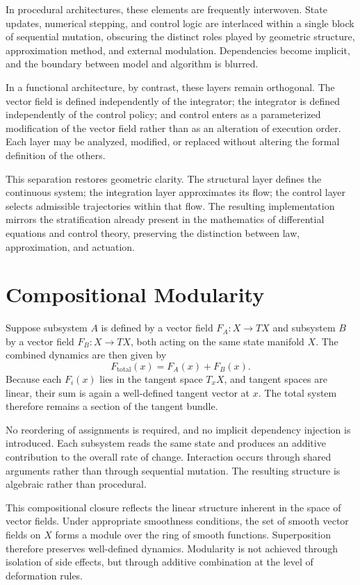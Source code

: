 \documentclass[12pt]{book}
\begin{document}
In procedural architectures, these elements are frequently interwoven.
State updates, numerical stepping, and control logic are interlaced
within a single block of sequential mutation, obscuring the distinct
roles played by geometric structure, approximation method, and
external modulation. Dependencies become implicit, and the boundary
between model and algorithm is blurred.

In a functional architecture, by contrast, these layers remain
orthogonal. The vector field is defined independently of the
integrator; the integrator is defined independently of the control
policy; and control enters as a parameterized modification of the
vector field rather than as an alteration of execution order. Each
layer may be analyzed, modified, or replaced without altering the
formal definition of the others.

This separation restores geometric clarity. The structural layer
defines the continuous system; the integration layer approximates its
flow; the control layer selects admissible trajectories within that
flow. The resulting implementation mirrors the stratification already
present in the mathematics of differential equations and control
theory, preserving the distinction between law, approximation, and
actuation.

\section{Compositional Modularity}

Suppose subsystem $A$ is defined by a vector field $F_A : X \to TX$
and subsystem $B$ by a vector field $F_B : X \to TX$, both acting on
the same state manifold $X$. The combined dynamics are then given by
\[
F_{\text{total}}(x) = F_A(x) + F_B(x).
\]
Because each $F_i(x)$ lies in the tangent space $T_xX$, and tangent
spaces are linear, their sum is again a well-defined tangent vector at
$x$. The total system therefore remains a section of the tangent
bundle.

No reordering of assignments is required, and no implicit dependency
injection is introduced. Each subsystem reads the same state and
produces an additive contribution to the overall rate of change.
Interaction occurs through shared arguments rather than through
sequential mutation. The resulting structure is algebraic rather than
procedural.

This compositional closure reflects the linear structure inherent in
the space of vector fields. Under appropriate smoothness conditions,
the set of smooth vector fields on $X$ forms a module over the ring of
smooth functions. Superposition therefore preserves well-defined
dynamics. Modularity is not achieved through isolation of side
effects, but through additive combination at the level of deformation
rules.
\end{document}
